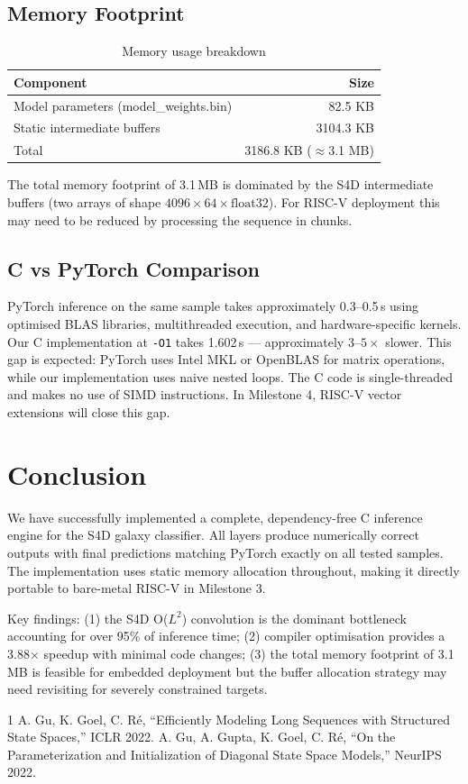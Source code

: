 \documentclass[conference]{IEEEtran}
\begin{document}
\subsection{Memory Footprint}
\begin{table}[h]
\centering
\caption{Memory usage breakdown}
\label{tab:mem}
\begin{tabular}{@{}lr@{}}
\toprule
Component & Size \\
\midrule
Model parameters (model\_weights.bin) & 82.5 KB \\
Static intermediate buffers & 3104.3 KB \\
\midrule
Total & 3186.8 KB ($\approx$3.1 MB) \\
\bottomrule
\end{tabular}
\end{table}

The total memory footprint of 3.1\,MB is dominated by the S4D intermediate
buffers (two arrays of shape $4096 \times 64 \times \text{float32}$).
For RISC-V deployment this may need to be reduced by processing the sequence
in chunks.

\subsection{C vs PyTorch Comparison}
PyTorch inference on the same sample takes approximately 0.3--0.5\,s using
optimised BLAS libraries, multithreaded execution, and hardware-specific
kernels. Our C implementation at \texttt{-O1} takes 1.602\,s --- approximately
$3\text{--}5\times$ slower. This gap is expected: PyTorch uses Intel MKL or
OpenBLAS for matrix operations, while our implementation uses naive nested
loops. The C code is single-threaded and makes no use of SIMD instructions.
In Milestone 4, RISC-V vector extensions will close this gap.

\section{Conclusion}
We have successfully implemented a complete, dependency-free C inference
engine for the S4D galaxy classifier. All layers produce numerically correct
outputs with final predictions matching PyTorch exactly on all tested samples.
The implementation uses static memory allocation throughout, making it
directly portable to bare-metal RISC-V in Milestone 3.

Key findings: (1) the S4D O($L^2$) convolution is the dominant bottleneck
accounting for over 95\% of inference time; (2) compiler optimisation provides
a 3.88$\times$ speedup with minimal code changes; (3) the total memory
footprint of 3.1\,MB is feasible for embedded deployment but the buffer
allocation strategy may need revisiting for severely constrained targets.

\begin{thebibliography}{1}
 A. Gu, K. Goel, C. R\'e, ``Efficiently Modeling Long Sequences
with Structured State Spaces,'' ICLR 2022.
 A. Gu, A. Gupta, K. Goel, C. R\'e, ``On the Parameterization
and Initialization of Diagonal State Space Models,'' NeurIPS 2022.
\end{thebibliography}
\end{document}
